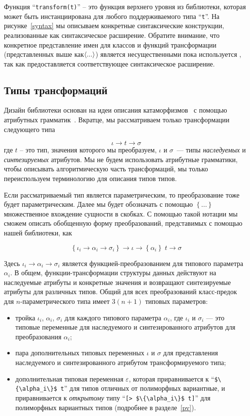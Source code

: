 Функция ``\lstinline{transform(t)}'' -- это функция верхнего уровня из библиотеки, которая может быть инстанциирована для любого поддерживаемого типа  ``\lstinline{t}''. На рисунке~\ref{syntax} мы описываем конкретные синтаксические конструкции, реализованные как синтаксическое расширение. Обратите внимание, что конкретное представление имен для классов и функций трансформации (представленных выше как$\left<...\right>$) является несущественными пока используется , так как предоставляется соответствующее синтаксическое расширение.

\subsection{Типы трансформаций}

Дизайн библиотеки основан на идеи описания катаморфизмов~\cite{Bananas} с помощью атрибутных 
грамматик~\cite{AGKnuth,AGSwierstra,ObjectAlgebrasAttribute}.
Вкратце, мы рассматриваем только трансформации следующего типа

\[
\iota \to t \to \sigma
\]
где $t$ -- это тип, значения которого мы преобразуем, $\iota$ и $\sigma$~--- типы \emph{наследуемых} и \emph{синтезируемых} атрибутов. 
Мы не будем использовать атрибутные грамматики, чтобы описывать алгоритмическую часть трансформаций, мы только переиспользуем терминологию для описания типов типов. 

Если рассматриваемый тип является параметрическим, то преобразование тоже будет параметрическим. Далее мы будет обозначать с помощью
$\left\{...\right\}$ множественное вхождение сущности в скобках. С помощью такой нотации мы сможем описать обобщенную форму преобразований, представимых с помощью нашей библиотеки, как

\[
  \left\{\iota_i \to \alpha_i \to \sigma_i\right\}\to\iota \to\left\{\alpha_i\right\}\;t \to \sigma
\]

Здесь $\iota_i\to\alpha_i\to\sigma_i$ является функцией-преобразованием для типового параметра $\alpha_i$. В общем, функции-трансформации структуры данных действуют на наследуемые атрибуты и конкретные значения и возвращают синтезируемые атрибуты для различных типов. Общий для всех преобразований класс-предок для $n$-параметрического типа имеет $3(n+1)$ типовых параметров:

\begin{itemize}
\item тройка $\iota_i$, $\alpha_i$, $\sigma_i$ для каждого типового параметра $\alpha_i$, где $\iota_i$ и $\sigma_i$ --- это типовые переменные для наследуемого и синтезированного атрибутов для преобразования  $\alpha_i$;
\item пара дополнительных типовых переменных $\iota$ и $\sigma$ для представления наследуемого и синтезированного атрибутом трансформируемого типа;
\item дополнительная типовая переменная $\varepsilon$, которая приравнивается к ``\lstinline|$\{\alpha_i\}$ t|'' для типов отличных от полиморфных вариантные, и приравнивается к \emph{открытому} типу ``\lstinline|[> $\{\alpha_i\}$ t]|'' для полиморфных вариантных типов (подробнее в 
разделе~\ref{pv}).
\end{itemize}

